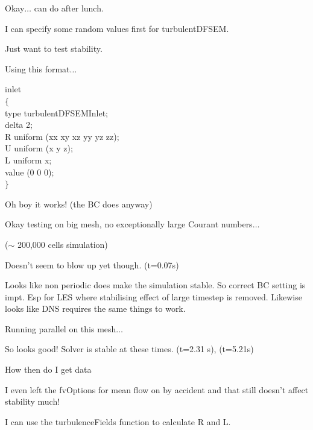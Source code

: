 \documentclass[12pt]{article}
\renewcommand{\_}{\kern-1.5pt\textunderscore\kern-1.5pt}
\begin{document}
Okay$ \ldots $  can do after lunch. \par

I can specify some random values first for turbulentDFSEM.\par

Just want to test stability.\par

Using this format$ \ldots $ \par

inlet \\
$ \{ $  \\
    type        turbulentDFSEMInlet; \\
    delta       2; \\
    R           uniform (xx xy xz yy yz zz); \\
    U           uniform (x y z); \\
    L           uniform x; \\
    value       (0 0 0); \\
$ \} $ \par

Oh boy it works! (the BC does anyway)\par

Okay testing on big mesh, no exceptionally large Courant numbers$ \ldots $ \par

($ \sim $ 200,000 cells simulation)\par

Doesn’t seem to blow up yet though. (t=0.07s)\par

Looks like non periodic does make the simulation stable. So correct BC setting is impt. Esp for LES where stabilising effect of large timestep is removed. Likewise looks like DNS requires the same things to work.\par

Running parallel on this mesh$ \ldots $ \par

So looks good! Solver is stable at these times. (t=2.31 s), (t=5.21s)\par

How then do I get data\par

I even left the fvOptions for mean flow on by accident and that still doesn’t affect stability much!\par


\vspace{\baselineskip}
I can use the turbulenceFields function to calculate R and L. \par
\end{document}
